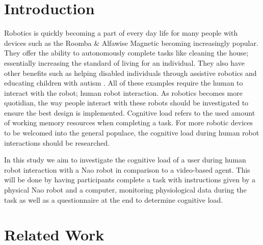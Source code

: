 \documentclass[conference]{IEEEtran}
\begin{document}
\section{Introduction}
Robotics is quickly becoming a part of every day life for many people with devices such as the Roomba \cite{web:roomba} \& Alfawise Magnetic \cite{web:alfawise} becoming increasingly popular. They offer the ability to autonomously complete tasks like cleaning the house; essentially increasing the standard of living for an individual. They also have other benefits such as helping disabled individuals through assistive robotics\cite{mataric2007socially} and educating children with autism \cite{shamsuddin2012initial}. All of these examples require the human to interact with the robot; human robot interaction. \newline
As robotics becomes more quotidian, the way people interact with these robots should be investigated to ensure the best design is implemented. Cognitive load refers to the used amount of working memory resources when completing a task. For more robotic devices to be welcomed into the general populace, the cognitive load during human robot interactions should be researched. \newline

In this study we aim to investigate the cognitive load of a user during human robot interaction with a Nao robot in comparison to a video-based agent. This will be done by having participants complete a task with instructions given by a physical Nao robot and a computer, monitoring physiological data during the task as well as a questionnaire at the end to determine cognitive load. 

\section{Related Work}
\end{document}

